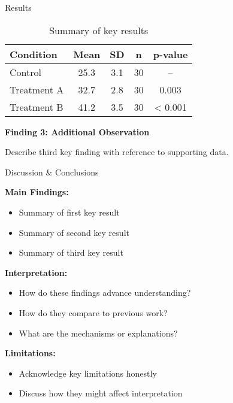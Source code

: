 \documentclass[final]{beamer}
\begin{document}
\begin{frame}[t]
\begin{columns}[t]
\begin{column}{.48\textwidth}
\begin{block}{Results}
\begin{table}
\centering
\caption{Summary of key results}
\begin{tabular}{lcccc}
\toprule
\textbf{Condition} & \textbf{Mean} & \textbf{SD} & \textbf{n} & \textbf{p-value} \\
\midrule
Control & 25.3 & 3.1 & 30 & -- \\
Treatment A & 32.7 & 2.8 & 30 & 0.003 \\
Treatment B & 41.2 & 3.5 & 30 & < 0.001 \\
\bottomrule
\end{tabular}
\end{table}

\vspace{0.5cm}

\textbf{Finding 3: Additional Observation}

Describe third key finding with reference to supporting data.

\end{block}

\vspace{1cm}

\begin{block}{Discussion \& Conclusions}

\textbf{Main Findings:}
\begin{itemize}
    \item Summary of first key result
    \item Summary of second key result
    \item Summary of third key result
\end{itemize}

\vspace{0.5cm}

\textbf{Interpretation:}
\begin{itemize}
    \item How do these findings advance understanding?
    \item How do they compare to previous work?
    \item What are the mechanisms or explanations?
\end{itemize}

\vspace{0.5cm}

\textbf{Limitations:}
\begin{itemize}
    \item Acknowledge key limitations honestly
    \item Discuss how they might affect interpretation
\end{itemize}


\end{block}
\end{column}
\end{columns}
\end{frame}
\end{document}
